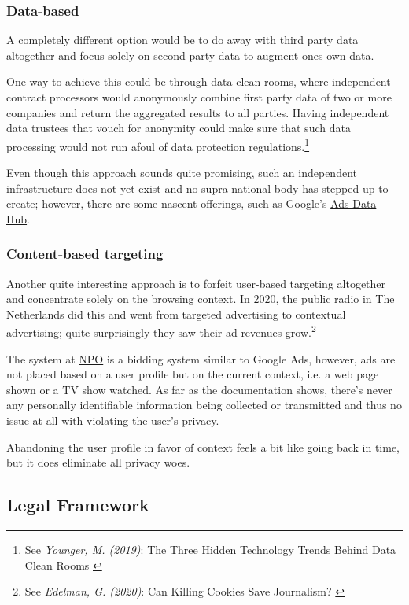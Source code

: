 \subsubsection{Data-based}

A completely different option would be to do away with third party data altogether and focus solely on second party data to augment ones own data. 

One way to achieve this could be through data clean rooms, where independent contract processors would anonymously combine first party data of two or more companies and return the aggregated results to all parties. Having independent data trustees that vouch for anonymity could make sure that such data processing would not run afoul of data protection regulations.\footnote{See \textit{Younger, M. (2019)}: The Three Hidden Technology Trends Behind Data Clean Rooms \cite{cleanRoom}}

Even though this approach sounds quite promising, such an independent infrastructure does not yet exist and no supra-national body has stepped up to create; however, there are some nascent offerings, such as Google's \href{https://developers.google.com/ads-data-hub}{Ads Data Hub}.

\subsubsection{Content-based targeting}

Another quite interesting approach is to forfeit user-based targeting altogether and concentrate solely on the browsing context. In 2020, the public radio in The Netherlands did this and went from targeted advertising to contextual advertising; quite surprisingly they saw their ad revenues grow.\footnote{See \textit{Edelman, G. (2020)}: Can Killing Cookies Save Journalism? \cite{killingCookies}} 

The system at \href{https://over.npo.nl/}{NPO} is a bidding system similar to Google Ads, however, ads are not placed based on a user profile but on the current context, i.e. a web page shown or a TV show watched. As far as the documentation shows, there's never any personally identifiable information being collected or transmitted and thus no issue at all with violating the user's privacy.

Abandoning the user profile in favor of context feels a bit like going back in time, but it does eliminate all privacy woes.

\subsection{Legal Framework}

